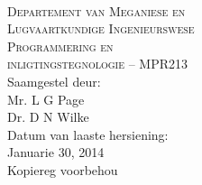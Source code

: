\begin{titlepage}
    \thispagestyle{empty}
    \begin{center}
        \ \\
        \vspace{1.5cm}
        {\Large
            \textsc{Departement van Meganiese en} \\
            \vspace{0.2cm}
            \textsc{Lugvaartkundige Ingenieurswese}} \\
        \vspace{1.2cm}
        {\huge
            \textsc{Programmering en} \\
            \vspace{0.4em}
            \textsc{inligtingstegnologie -- MPR213}} \\
        \vspace{2.0cm}
        {\large Saamgestel deur:} \\
        \vspace{0.2cm}
        {\large Mr. L G Page} \\
        {\large Dr. D N Wilke} \\
        \vspace{1cm}
        {\large Datum van laaste hersiening:} \\
        \vspace{0.2cm}
        {\large Januarie 30, 2014} \\
        \vspace{1cm}
        {\large Kopiereg voorbehou} \\
    \end{center}
\end{titlepage}
